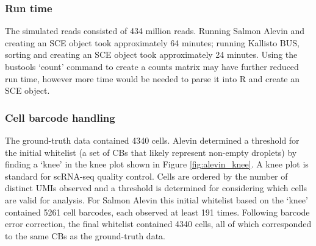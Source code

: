 
\subsubsection{Run time}
The simulated reads consisted of 434 million reads.
Running Salmon Alevin and creating an SCE object took approximately 64 minutes;
running Kallisto BUS, sorting and creating an SCE object took approximately 24 minutes.
Using the bustools `count' command to create a counts matrix may have further reduced run time, however more time would be needed to parse it into R and create an SCE object.

\subsubsection{Cell barcode handling}
The ground-truth data contained 4340 cells.
Alevin determined a threshold for the initial whitelist (a set of CBs that likely represent non-empty droplets) by finding a `knee' in the knee plot shown in Figure \ref{fig:alevin_knee}.
A knee plot is standard for scRNA-seq quality control.
Cells are ordered by the number of distinct UMIs observed and a threshold is determined for considering which cells are valid for analysis.
For Salmon Alevin this initial whitelist based on the `knee' contained 5261 cell barcodes, each observed at least 191 times.
Following barcode error correction, the final whitelist contained 4340 cells, all of which corresponded to the same CBs as the ground-truth data.

